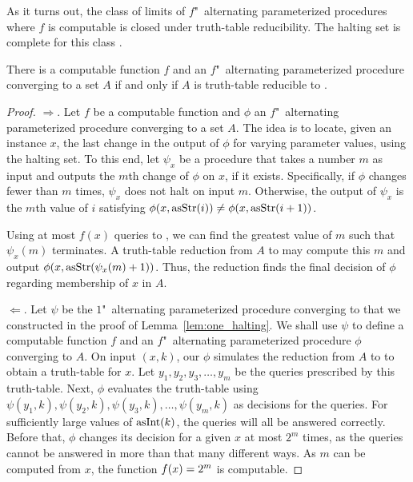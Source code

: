 As it turns out, the class of limits of $f$"~alternating parameterized procedures where $f$ is computable is closed under truth-table reducibility.
The halting set is complete for this class \parencite{epstein1981hierarchies,arslanov1997degree,downey2010algorithmic}.
\begin{theorem}
\label{thm:truthtable_halt}%
  There is a computable function $f$ and an $f$"~alternating parameterized procedure converging to a set $A$ if and only if $A$ is truth-table reducible to .
\end{theorem}
\begin{proof}
  $\Longrightarrow$.
  Let $f$ be a computable function and $\phi$ an $f$"~alternating parameterized procedure converging to a set $A$.
  The idea is to locate, given an instance $x$, the last change in the output of $\phi$ for varying parameter values, using the halting set.
  To this end, let $\psi_x$ be a procedure that takes a number $m$ as input and outputs the $m$th change of $\phi$ on $x$, if it exists.
  Specifically, if $\phi$ changes fewer than $m$ times, $\psi_x$ does not halt on input $m$.
  Otherwise, the output of $\psi_x$ is the $m$th value of $i$ satisfying $\phi(x, \operatorname{asStr}(i)) \neq \phi(x, \operatorname{asStr}(i + 1))$.

  Using at most $f(x)$ queries to , we can find the greatest value of $m$ such that $\psi_x(m)$ terminates.
  A truth-table reduction from $A$ to  may compute this $m$ and output $\phi(x, \operatorname{asStr}(\psi_x(m) + 1))$.
  Thus, the reduction finds the final decision of $\phi$ regarding membership of $x$ in $A$.

  $\Longleftarrow$.
  Let $\psi$ be the $1$"~alternating parameterized procedure converging to  that we constructed in the proof of Lemma~\ref{lem:one_halting}.
  We shall use $\psi$ to define a computable function $f$ and an $f$"~alternating parameterized procedure $\phi$ converging to $A$.
  On input $(x, k)$, our $\phi$ simulates the reduction from $A$ to  to obtain a truth-table for $x$.
  Let $y_1, y_2, y_3, \ldots, y_m$ be the queries prescribed by this truth-table.
  Next, $\phi$ evaluates the truth-table using $\psi(y_1, k), \psi(y_2, k), \psi(y_3, k), \ldots, \psi(y_m, k)$ as decisions for the queries.
  For sufficiently large values of $\operatorname{asInt}(k)$, the queries will all be answered correctly.
  Before that, $\phi$ changes its decision for a given $x$ at most $2^m$ times, as the queries cannot be answered in more than that many different ways.
  As $m$ can be computed from $x$, the function $f(x) = 2^m$ is computable.
\end{proof}

